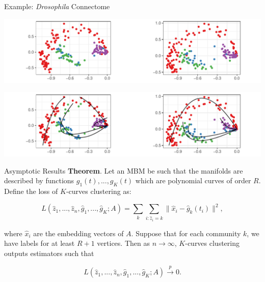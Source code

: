 \documentclass[
  ignorenonframetext,
]{beamer}
\begin{document}
\begin{frame}{Example: \emph{Drosophila} Connectome}
\protect\hypertarget{example-drosophila-connectome}{}
\begin{center}\includegraphics[width=1\linewidth]{slides_files/figure-beamer/mbconnectome-ase-2-1} \end{center}

\begin{center}\includegraphics[width=1\linewidth]{slides_files/figure-beamer/mbconnectome-kcurves-1} \end{center}
\end{frame}

\begin{frame}{Asymptotic Results}
\protect\hypertarget{asymptotic-results}{}
\textbf{Theorem}. Let an MBM be such that the manifolds are described by
functions \(g_1(t), ..., g_K(t)\) which are polynomial curves of order
\(R\). Define the loss of \(K\)-curves clustering as:

\[L(\hat{z}_1, ..., \hat{z}_n, \hat{g}_1, ..., \hat{g}_K; A) = \sum_k \sum_{i : \hat{z}_i = k} \|\hat{x}_{i} - \hat{g}_k(t_{i})\|^2,\]

where \(\hat{x}_i\) are the embedding vectors of \(A\). Suppose that for
each community \(k\), we have labels for at least \(R + 1\) vertices.
Then as \(n \to \infty\), \(K\)-curves clustering outputs estimators
such that

\[L(\hat{z}_1, ..., \hat{z}_n, \hat{g}_1, ..., \hat{g}_K; A) \stackrel{p}{\to} 0.\]
\end{frame}
\end{document}
